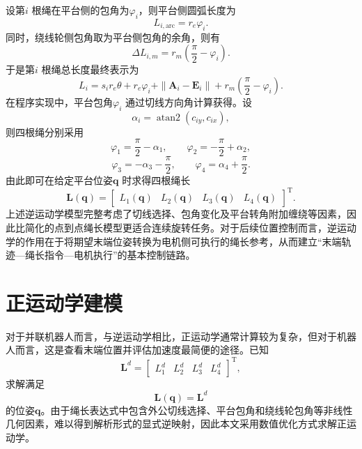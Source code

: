 设第$i$ 根绳在平台侧的包角为$\varphi_i$，则平台侧圆弧长度为
\begin{equation}
  L_{i,\mathrm{arc}}=r_e\varphi_i. \label{eq:ch3-arc-length}
\end{equation}
同时，绕线轮侧包角取为平台侧包角的余角，则有
\begin{equation}
  \Delta L_{i,m}=r_m\left(\frac{\pi}{2}-\varphi_i\right). \label{eq:ch3-delta-motor}
\end{equation}
于是第$i$ 根绳总长度最终表示为
\begin{equation}
  L_i=s_i r_e\theta+r_e\varphi_i+\|\bm A_i-\bm E_i\|+r_m\left(\frac{\pi}{2}-\varphi_i\right). \label{eq:ch3-li-final}
\end{equation}
在程序实现中，平台包角$\varphi_i$ 通过切线方向角计算获得。设
\begin{equation}
  \alpha_i=\operatorname{atan2}(c_{iy},c_{ix}),
\end{equation}
则四根绳分别采用
\begin{equation}
  \varphi_1=\frac{\pi}{2}-\alpha_1,\qquad \varphi_2=-\frac{\pi}{2}+\alpha_2, \label{eq:ch3-angle12}
\end{equation}
\begin{equation}
  \varphi_3=-\alpha_3-\frac{\pi}{2},\qquad \varphi_4=\alpha_4+\frac{\pi}{2}. \label{eq:ch3-angle34}
\end{equation}
由此即可在给定平台位姿$\bm q$ 时求得四根绳长
\begin{equation}
  \bm L(\bm q)= \begin{bmatrix} L_1(\bm q) & L_2(\bm q) & L_3(\bm q) & L_4(\bm q) \end{bmatrix}^{\mathrm T}.
\end{equation}
上述逆运动学模型完整考虑了切线选择、包角变化及平台转角附加缠绕等因素，因此比简化的点到点绳长模型更适合连续旋转任务。对于后续位置控制而言，逆运动学的作用在于将期望末端位姿转换为电机侧可执行的绳长参考，从而建立“末端轨迹—绳长指令—电机执行”的基本控制链路。

\section{正运动学建模}

对于并联机器人而言，与逆运动学相比，正运动学通常计算较为复杂，但对于机器人而言，这是查看末端位置并评估加速度最简便的途径。已知
\begin{equation}
  \bm L^{d}= \begin{bmatrix} L_1^{d} & L_2^{d} & L_3^{d} & L_4^{d} \end{bmatrix}^{\mathrm T},
\end{equation}
求解满足
\begin{equation}
  \bm L(\bm q)=\bm L^{d} \label{eq:ch3-forward-basic}
\end{equation}
的位姿$\bm q$。由于绳长表达式中包含外公切线选择、平台包角和绕线轮包角等非线性几何因素，难以得到解析形式的显式逆映射，因此本文采用数值优化方式求解正运动学。

